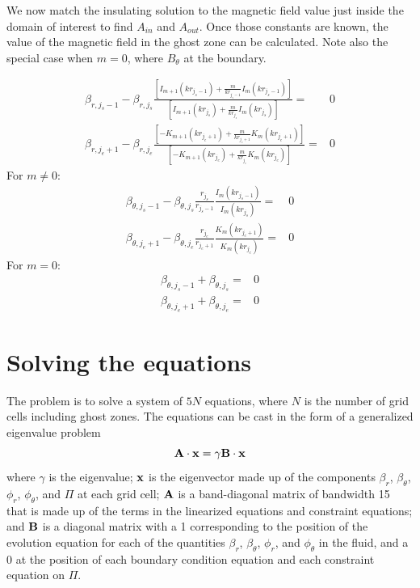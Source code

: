 \documentclass[letterpaper]{article}
\begin{document}
We now match the insulating solution to the magnetic field value just
inside the domain of interest to find $A_{in}$ and $A_{out}$. Once
those constants are known, the value of the magnetic field in the
ghost zone can be calculated. Note also the special case when $m=0$,
where $B_\theta$ at the boundary.

\begin{align}
\beta_{r, j_s-1} - \beta_{r, j_s}
 \frac{\left[I_{m+1}(kr_{j_s-1})+\frac{m}{kr_{j_s-1}}I_{m}(kr_{j_s-1})\right]}
      {\left[I_{m+1}(kr_{j_s})+\frac{m}{kr_{j_s}}I_{m}(kr_{j_s})\right]}
=& 0
\\
\beta_{r, j_e+1} - \beta_{r, j_e}
 \frac{\left[-K_{m+1}(kr_{j_e+1})+\frac{m}{kr_{j_e+1}}K_{m}(kr_{j_e+1})\right]}
      {\left[-K_{m+1}(kr_{j_e})+\frac{m}{kr_{j_e}}K_{m}(kr_{j_e})\right]}
=& 0
\end{align}
For $m \ne 0$:
\begin{align}
\beta_{\theta, j_s-1} - \beta_{\theta, j_s}\frac{r_{j_s}}{r_{j_s-1}}
 \frac{I_m(kr_{j_s-1})}{I_m(kr_{j_s})} =& 0
\\
\beta_{\theta, j_e+1} - \beta_{\theta, j_e}\frac{r_{j_e}}{r_{j_e+1}}
 \frac{K_m(kr_{j_e+1})}{K_m(kr_{j_e})} =& 0
\end{align}
For $m = 0$:
\begin{align}
\beta_{\theta, j_s-1} + \beta_{\theta, j_s} =& 0
\\
\beta_{\theta, j_e+1} + \beta_{\theta, j_e} =& 0
\end{align}

\section{Solving the equations}

The problem is to solve a system of $5N$ equations, where $N$ is the
number of grid cells including ghost zones. The equations can be cast
in the form of a generalized eigenvalue problem
\begin{equation}
{\bf A}\cdot{\bf x} = \gamma {\bf B}\cdot{\bf x}
\end{equation}
where $\gamma$ is the eigenvalue; ${\bf x}$ is the eigenvector made up
of the components $\beta_r$, $\beta_\theta$, $\phi_r$, $\phi_\theta$,
and $\Pi$ at each grid cell; ${\bf A}$ is a band-diagonal matrix of
bandwidth 15 that is made up of the terms in the linearized equations
and constraint equations; and ${\bf B}$ is a diagonal matrix with a 1
corresponding to the position of the evolution equation for each of
the quantities $\beta_r$, $\beta_\theta$, $\phi_r$, and $\phi_\theta$
in the fluid, and a 0 at the position of each boundary condition
equation and each constraint equation on $\Pi$.
\end{document}
